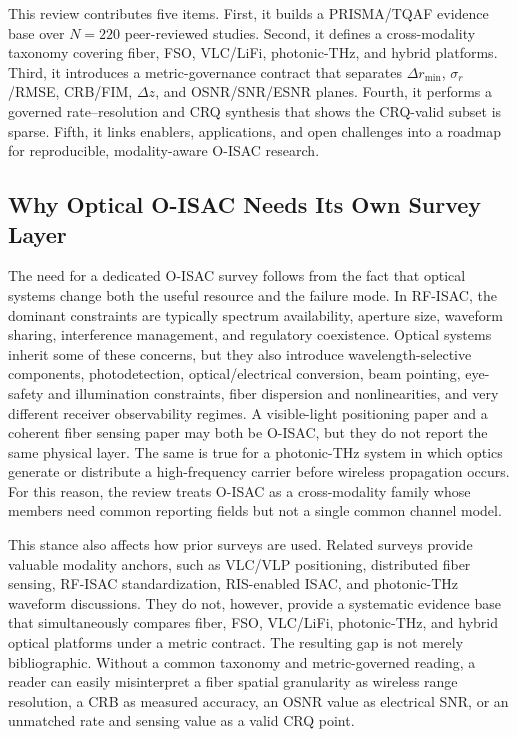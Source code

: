 \documentclass[letterpaper,journal]{IEEEtran}
\begin{document}
This review contributes five items. First, it builds a PRISMA/TQAF evidence base over \(N=220\) peer-reviewed studies. Second, it defines a cross-modality taxonomy covering fiber, FSO, VLC/LiFi, photonic-THz, and hybrid platforms. Third, it introduces a metric-governance contract that separates \(\Delta r_{\min}\), \(\sigma_r\)/RMSE, CRB/FIM, \(\Delta z\), and OSNR/SNR/ESNR planes. Fourth, it performs a governed rate--resolution and CRQ synthesis that shows the CRQ-valid subset is sparse. Fifth, it links enablers, applications, and open challenges into a roadmap for reproducible, modality-aware O-ISAC research.

\subsection{Why Optical O-ISAC Needs Its Own Survey Layer}

The need for a dedicated O-ISAC survey follows from the fact that optical systems change both the useful resource and the failure mode. In RF-ISAC, the dominant constraints are typically spectrum availability, aperture size, waveform sharing, interference management, and regulatory coexistence. Optical systems inherit some of these concerns, but they also introduce wavelength-selective components, photodetection, optical/electrical conversion, beam pointing, eye-safety and illumination constraints, fiber dispersion and nonlinearities, and very different receiver observability regimes. A visible-light positioning paper and a coherent fiber sensing paper may both be O-ISAC, but they do not report the same physical layer. The same is true for a photonic-THz system in which optics generate or distribute a high-frequency carrier before wireless propagation occurs. For this reason, the review treats O-ISAC as a cross-modality family whose members need common reporting fields but not a single common channel model.

This stance also affects how prior surveys are used. Related surveys provide valuable modality anchors, such as VLC/VLP positioning, distributed fiber sensing, RF-ISAC standardization, RIS-enabled ISAC, and photonic-THz waveform discussions. They do not, however, provide a systematic evidence base that simultaneously compares fiber, FSO, VLC/LiFi, photonic-THz, and hybrid optical platforms under a metric contract. The resulting gap is not merely bibliographic. Without a common taxonomy and metric-governed reading, a reader can easily misinterpret a fiber spatial granularity as wireless range resolution, a CRB as measured accuracy, an OSNR value as electrical SNR, or an unmatched rate and sensing value as a valid CRQ point.
\end{document}
